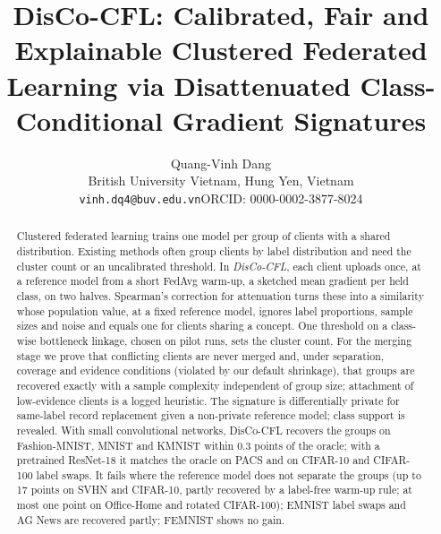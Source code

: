 \documentclass[11pt]{article}
\title{\textbf{DisCo-CFL: Calibrated, Fair and Explainable Clustered Federated Learning via Disattenuated Class-Conditional Gradient Signatures}}
\author{Quang-Vinh Dang\\
British University Vietnam, Hung Yen, Vietnam\\
\texttt{vinh.dq4@buv.edu.vn}\quad ORCID: 0000-0002-3877-8024}
\date{}
\theoremstyle{definition}
\theoremstyle{remark}
\begin{document}
\maketitle

\begin{abstract}
Clustered federated learning trains one model per group of clients with a shared distribution. Existing methods often group clients by label distribution and need the cluster count or an uncalibrated threshold. In \emph{DisCo-CFL}, each client uploads once, at a reference model from a short FedAvg warm-up, a sketched mean gradient per held class, on two halves. Spearman's correction for attenuation turns these into a similarity whose population value, at a fixed reference model, ignores label proportions, sample sizes and noise and equals one for clients sharing a concept. One threshold on a class-wise bottleneck linkage, chosen on pilot runs, sets the cluster count. For the merging stage we prove that conflicting clients are never merged and, under separation, coverage and evidence conditions (violated by our default shrinkage), that groups are recovered exactly with a sample complexity independent of group size; attachment of low-evidence clients is a logged heuristic. The signature is differentially private for same-label record replacement given a non-private reference model; class support is revealed. With small convolutional networks, DisCo-CFL recovers the groups on Fashion-MNIST, MNIST and KMNIST within $0.3$ points of the oracle; with a pretrained ResNet-18 it matches the oracle on PACS and on CIFAR-10 and CIFAR-100 label swaps. It fails where the reference model does not separate the groups (up to 17 points on SVHN and CIFAR-10, partly recovered by a label-free warm-up rule; at most one point on Office-Home and rotated CIFAR-100); EMNIST label swaps and AG News are recovered partly; FEMNIST shows no gain.
\end{abstract}
\end{document}
